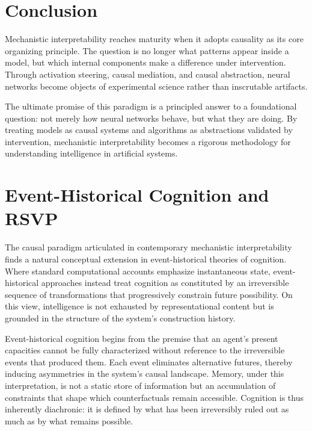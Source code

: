 \documentclass[11pt]{article}
\begin{document}
\section{Conclusion}

Mechanistic interpretability reaches maturity when it adopts causality as its
core organizing principle. The question is no longer what patterns appear inside
a model, but which internal components make a difference under intervention.
Through activation steering, causal mediation, and causal abstraction, neural
networks become objects of experimental science rather than inscrutable
artifacts.

The ultimate promise of this paradigm is a principled answer to a foundational
question: not merely how neural networks behave, but what they are doing. By
treating models as causal systems and algorithms as abstractions validated by
intervention, mechanistic interpretability becomes a rigorous methodology for
understanding intelligence in artificial systems.

\section{Event-Historical Cognition and RSVP}

The causal paradigm articulated in contemporary mechanistic interpretability
finds a natural conceptual extension in event-historical theories of cognition.
Where standard computational accounts emphasize instantaneous state,
event-historical approaches instead treat cognition as constituted by an
irreversible sequence of transformations that progressively constrain future
possibility. On this view, intelligence is not exhausted by representational
content but is grounded in the structure of the system’s construction history.

Event-historical cognition begins from the premise that an agent’s present
capacities cannot be fully characterized without reference to the irreversible
events that produced them. Each event eliminates alternative futures, thereby
inducing asymmetries in the system’s causal landscape. Memory, under this
interpretation, is not a static store of information but an accumulation of
constraints that shape which counterfactuals remain accessible. Cognition is
thus inherently diachronic: it is defined by what has been irreversibly ruled
out as much as by what remains possible.
\end{document}
